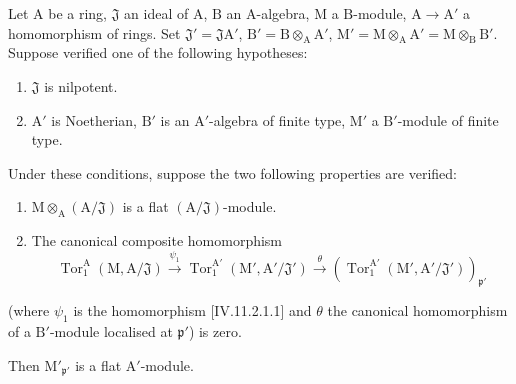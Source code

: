 \begin{lemma}[11.2.5]
\label{IV.11.2.5}
Let $\mathrm{A}$ be a ring, $\mathfrak{J}$ an ideal of $\mathrm{A}$, $\mathrm{B}$ an $\mathrm{A}$-algebra, $\mathrm{M}$ a $\mathrm{B}$-module, $\mathrm{A}\to\mathrm{A}'$ a homomorphism of rings. Set $\mathfrak{J}'=\mathfrak{J}\mathrm{A}'$, $\mathrm{B}'=\mathrm{B}\otimes_\mathrm{A}\mathrm{A}'$, $\mathrm{M}'=\mathrm{M}\otimes_\mathrm{A}\mathrm{A}'=\mathrm{M}\otimes_\mathrm{B}\mathrm{B}'$. Suppose verified one of the following hypotheses:
\begin{enumerate}[label=\emph{\alph*)}]
  \item $\mathfrak{J}$ is nilpotent.
  \item $\mathrm{A}'$ is Noetherian, $\mathrm{B}'$ is an $\mathrm{A}'$-algebra of finite type, $\mathrm{M}'$ a $\mathrm{B}'$-module of finite type.
\end{enumerate}
Under these conditions, suppose the two following properties are verified:
\begin{enumerate}[label=\emph{(\roman*)}]
  \item $\mathrm{M}\otimes_\mathrm{A}(\mathrm{A}/\mathfrak{J})$ is a flat $(\mathrm{A}/\mathfrak{J})$-module.
  \item The canonical composite homomorphism
\[
  \operatorname{Tor}_1^\mathrm{A}(\mathrm{M},\mathrm{A}/\mathfrak{J})\xrightarrow{\psi_1}\operatorname{Tor}_1^{\mathrm{A}'}(\mathrm{M}',\mathrm{A}'/\mathfrak{J}')\xrightarrow{\theta}(\operatorname{Tor}_1^{\mathrm{A}'}(\mathrm{M}',\mathrm{A}'/\mathfrak{J}'))_{\mathfrak{p}'}
\]
\end{enumerate}
(where $\psi_1$ is the homomorphism [IV.11.2.1.1] and $\theta$ the canonical homomorphism of a $\mathrm{B}'$-module localised at $\mathfrak{p}'$) is zero.

Then $\mathrm{M}'_{\mathfrak{p}'}$ is a flat $\mathrm{A}'$-module.
\end{lemma}

